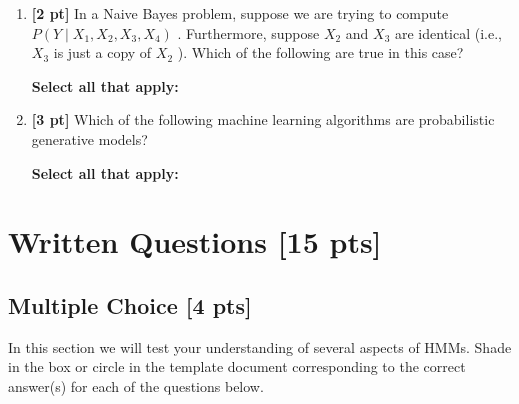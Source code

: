 \documentclass{article}
\begin{document}
\begin{enumerate}
\begin{tcolorbox}[fit,height=1cm, width=4cm, blank, borderline={1pt}{-2pt},nobeforeafter]
    \end{tcolorbox}
    
    \item \textbf{[2 pt]} In a Naive Bayes problem, suppose we are trying to compute $P(Y\mid X_1,X_2,X_3,X_4)$ .  Furthermore, suppose  $X_2$  and  $X_3$  are identical (i.e., $X_3$  is just a copy of $X_2$ ).  Which of the following are true in this case?

    \textbf{Select all that apply:}
    
    \item \textbf{[3 pt]} Which of the following machine learning algorithms are probabilistic generative models? 

    \textbf{Select all that apply:}

\end{enumerate}

\clearpage

\section{Written Questions [15 pts]}
\subsection{Multiple Choice [4 pts]}
In this section we will test your understanding of several aspects of HMMs.
%
Shade in the box or circle in the template document corresponding to the correct answer(s) for each of the questions below. 
\end{document}
